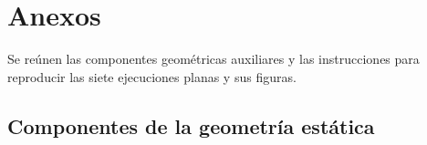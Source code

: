 \chapter{Anexos}
\label{ch:anexos}

Se reúnen las componentes geométricas auxiliares y las instrucciones
para reproducir las siete ejecuciones planas y sus figuras.

\section{Componentes de la geometría estática}


